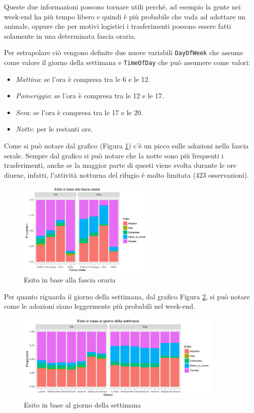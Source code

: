 Queste due informazioni possono tornare utili perché, ad esempio la gente nei week-end ha più tempo libero e quindi è più probabile che vada ad adottare un animale, oppure che per motivi logistici i trasferimenti possono essere fatti solamente in una determinata fascia oraria.

Per estrapolare ciò vengono definite due nuove variabili \texttt{DayOfWeek} che assume come valore il giorno della settimana e \texttt{TimeOfDay} che può assumere come valori:

\begin{itemize}
	\item \textit{Mattina}: se l'ora è compresa tra le 6 e le 12.
	\item \textit{Pomeriggio}: se l'ora è compresa tra le 12 e le 17.
	\item \textit{Sera}: se l'ora è compresa tra le 17 e le 20.
	\item \textit{Notte}: per le restanti ore.
\end{itemize}

Come si può notare dal grafico (Figura \ref{fig-time}) c'è un picco sulle adozioni nella fascia serale. Sempre dal grafico si può notare che la notte sono più frequenti i trasferimenti, anche se la maggior parte di questi viene svolta durante le ore diurne, infatti, l'attività notturna del rifugio è molto limitata (423 osservazioni).

\begin{figure}[htbp]
	\centering
	\includegraphics[width=0.6\textwidth]{./grafici/esito_time.pdf}
	\caption{Esito in base alla fascia oraria}\label{fig-time}
\end{figure}

Per quanto riguarda il giorno della settimana, dal grafico Figura \ref{fig-dow}, si può notare come le adozioni siano leggermente più probabili nel week-end.

\begin{figure}[htbp]
	\centering
	\includegraphics[width=0.9\textwidth]{./grafici/esito_week.pdf}
	\caption{Esito in base al giorno della settimana}\label{fig-dow}
\end{figure}

